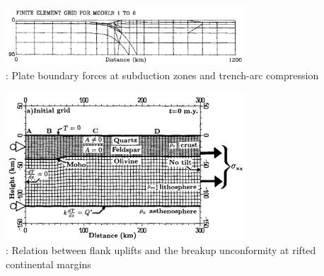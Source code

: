 \begin{center}
\begin{minipage}{0.48\textwidth}
\centering
\includegraphics[width=9cm]{images/history/boww89}\\
{: Plate boundary forces at subduction zones and trench-arc compression \cite{boww89}}
\end{minipage}\hfill
\begin{minipage}{0.45\textwidth}
\includegraphics[width=9cm]{images/history/brbe89}\\
{: Relation between flank uplifts and the breakup unconformity at rifted continental margins \cite{brbe89}}
\end{minipage}
\end{center}



